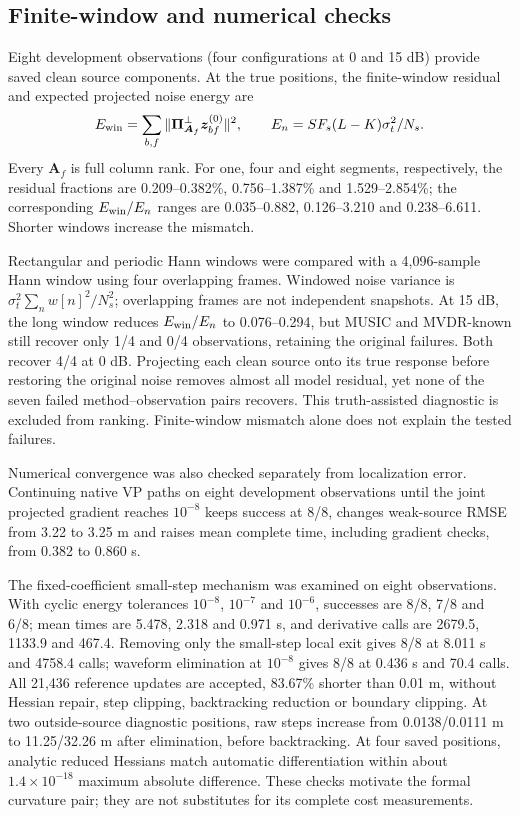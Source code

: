 \documentclass[a4paper,fleqn,review]{cas-sc}
\begin{document}
\FloatBarrier
\subsection{Finite-window and numerical checks}
\label{en:windowcheck}
Eight development observations (four configurations at 0 and 15 dB) provide saved clean source components. At the true positions, the finite-window residual and expected projected noise energy are
\begin{equation}
E_{\rm win}=\sum_{b,f}\|\bm\Pi_{\bm A_f}^{\perp}\bm z_{bf}^{(0)}\|^2,
\qquad E_n=SF_s(L-K)\sigma_t^2/N_s.
\end{equation}
Every $\bm A_f$ is full column rank. For one, four and eight segments, respectively, the residual fractions are 0.209--0.382\%, 0.756--1.387\% and 1.529--2.854\%; the corresponding $E_{\rm win}/E_n$ ranges are 0.035--0.882, 0.126--3.210 and 0.238--6.611. Shorter windows increase the mismatch.

Rectangular and periodic Hann windows were compared with a 4,096-sample Hann window using four overlapping frames. Windowed noise variance is $\sigma_t^2\sum_n w[n]^2/N_s^2$; overlapping frames are not independent snapshots. At 15 dB, the long window reduces $E_{\rm win}/E_n$ to 0.076--0.294, but MUSIC and MVDR-known still recover only 1/4 and 0/4 observations, retaining the original failures. Both recover 4/4 at 0 dB. Projecting each clean source onto its true response before restoring the original noise removes almost all model residual, yet none of the seven failed method--observation pairs recovers. This truth-assisted diagnostic is excluded from ranking. Finite-window mismatch alone does not explain the tested failures.

\label{en:localchecks}
Numerical convergence was also checked separately from localization error. Continuing native VP paths on eight development observations until the joint projected gradient reaches $10^{-8}$ keeps success at 8/8, changes weak-source RMSE from 3.22 to 3.25 m and raises mean complete time, including gradient checks, from 0.382 to 0.860 s.

The fixed-coefficient small-step mechanism was examined on eight observations. With cyclic energy tolerances $10^{-8}$, $10^{-7}$ and $10^{-6}$, successes are 8/8, 7/8 and 6/8; mean times are 5.478, 2.318 and 0.971 s, and derivative calls are 2679.5, 1133.9 and 467.4. Removing only the small-step local exit gives 8/8 at 8.011 s and 4758.4 calls; waveform elimination at $10^{-8}$ gives 8/8 at 0.436 s and 70.4 calls. All 21,436 reference updates are accepted, 83.67\% shorter than 0.01 m, without Hessian repair, step clipping, backtracking reduction or boundary clipping. At two outside-source diagnostic positions, raw steps increase from 0.0138/0.0111 m to 11.25/32.26 m after elimination, before backtracking. At four saved positions, analytic reduced Hessians match automatic differentiation within about $1.4\times10^{-18}$ maximum absolute difference. These checks motivate the formal curvature pair; they are not substitutes for its complete cost measurements.
\end{document}

